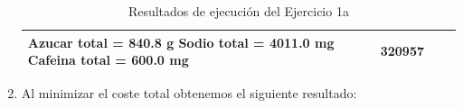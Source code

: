 \documentclass[11pt]{article}
\begin{document}
\begin{enumerate}[label=\alph*)]
\begin{table}[H]
\begin{tabular}{| >{\centering\arraybackslash}m{3cm} | m{5.75cm} | >{\centering\arraybackslash}m{3cm} | >{\centering\arraybackslash}m{4.5cm} |}
            Azucar total = 840.8 g \newline
            Sodio total = 4011.0 mg \newline
            Cafeina total = 600.0 mg
            & 320957 & 40511
            \\
            \hline
        \end{tabular}%
        \caption{Resultados de ejecución del Ejercicio 1a}
        \label{tab:resultados_1a} 
    \end{table}

    \item Al minimizar el coste total obtenemos el siguiente resultado:
    
    \begin{table}[H]
        \centering
        \renewcommand{\arraystretch}{1.5} %
        

\end{table}
\end{enumerate}
\end{document}
